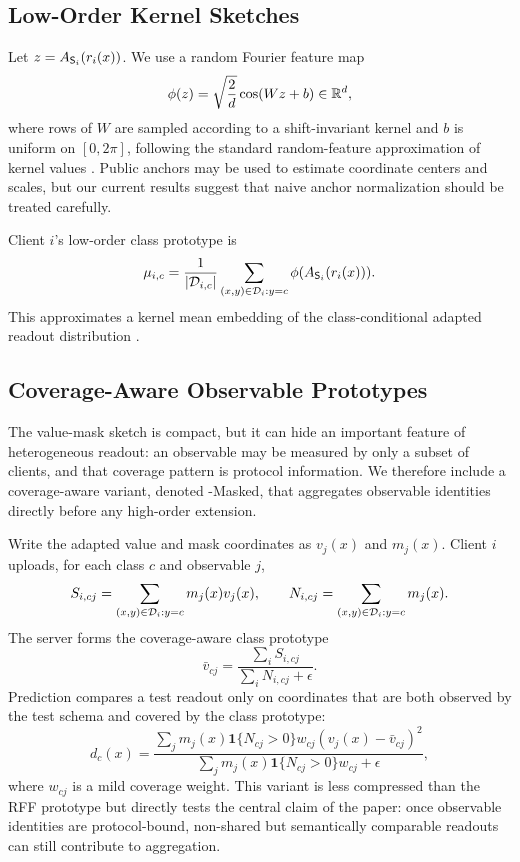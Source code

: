\subsection{Low-Order Kernel Sketches}

Let \(z=A_{\mathsf{S}_i}(r_i(x))\). We use a random Fourier feature map
\begin{equation}
    \phi(z)=\sqrt{\frac{2}{d}}\cos(Wz+b)\in\mathbb{R}^d,
\end{equation}
where rows of \(W\) are sampled according to a shift-invariant kernel and \(b\) is uniform on \([0,2\pi]\), following the standard random-feature approximation of kernel values \cite{rahimi2007random}. Public anchors may be used to estimate coordinate centers and scales, but our current results suggest that naive anchor normalization should be treated carefully.

Client \(i\)'s low-order class prototype is
\begin{equation}
    \mu_{i,c} =
    \frac{1}{|\mathcal{D}_{i,c}|}\sum_{(x,y)\in\mathcal{D}_i:y=c}
    \phi(A_{\mathsf{S}_i}(r_i(x))).
\end{equation}
This approximates a kernel mean embedding of the class-conditional adapted readout distribution \cite{smola2007hilbert,gretton2012mmd}.

\subsection{Coverage-Aware Observable Prototypes}

The value-mask sketch is compact, but it can hide an important feature of heterogeneous readout: an observable may be measured by only a subset of clients, and that coverage pattern is protocol information. We therefore include a coverage-aware variant, denoted \method{}-Masked, that aggregates observable identities directly before any high-order extension.

Write the adapted value and mask coordinates as \(v_j(x)\) and \(m_j(x)\). Client \(i\) uploads, for each class \(c\) and observable \(j\),
\begin{equation}
    S_{i,cj}=\sum_{(x,y)\in\mathcal{D}_i:y=c}m_j(x)v_j(x),
    \qquad
    N_{i,cj}=\sum_{(x,y)\in\mathcal{D}_i:y=c}m_j(x).
\end{equation}
The server forms the coverage-aware class prototype
\begin{equation}
    \bar v_{cj}=
    \frac{\sum_i S_{i,cj}}{\sum_i N_{i,cj}+\epsilon}.
\end{equation}
Prediction compares a test readout only on coordinates that are both observed by the test schema and covered by the class prototype:
\begin{equation}
    d_c(x)=
    \frac{
    \sum_j m_j(x)\mathbf{1}\{N_{cj}>0\}w_{cj}
    (v_j(x)-\bar v_{cj})^2
    }{
    \sum_j m_j(x)\mathbf{1}\{N_{cj}>0\}w_{cj}+\epsilon
    },
\end{equation}
where \(w_{cj}\) is a mild coverage weight. This variant is less compressed than the RFF prototype but directly tests the central claim of the paper: once observable identities are protocol-bound, non-shared but semantically comparable readouts can still contribute to aggregation.

